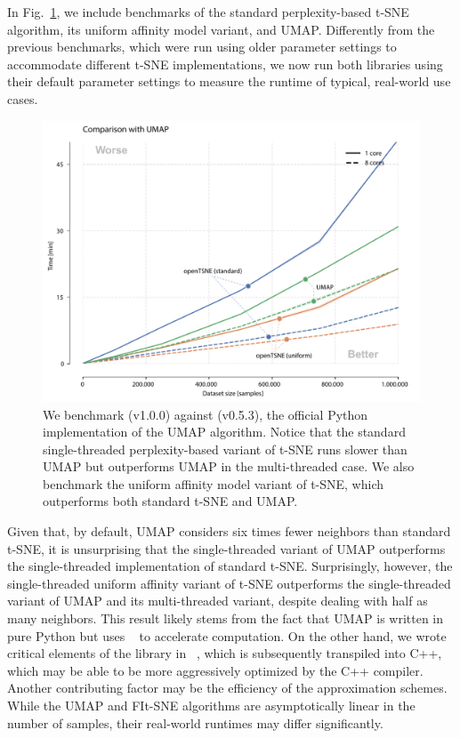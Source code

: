 \documentclass[article]{jss}
\newcommand{\opentsne}{\pkg{openTSNE}\xspace}
\begin{document}
In Fig.~\ref{fig:benchmarks_umap}, we include benchmarks of the standard perplexity-based t-SNE algorithm, its uniform affinity model variant, and UMAP. Differently from the previous benchmarks, which were run using older parameter settings to accommodate different t-SNE implementations, we now run both libraries using their default parameter settings to measure the runtime of typical, real-world use cases.
\begin{figure}[ht]
  \centering
  \includegraphics{benchmarks_umap-final}
  \caption{\label{fig:benchmarks_umap} We benchmark \opentsne (v1.0.0) against  (v0.5.3), the official \textsf{Python} implementation of the UMAP algorithm. Notice that the standard single-threaded perplexity-based variant of t-SNE runs slower than UMAP but outperforms UMAP in the multi-threaded case. We also benchmark the uniform affinity model variant of t-SNE, which outperforms both standard t-SNE and UMAP.}
\end{figure}

Given that, by default, UMAP considers six times fewer neighbors than standard t-SNE, it is unsurprising that the single-threaded variant of UMAP outperforms the single-threaded implementation of standard t-SNE. Surprisingly, however, the single-threaded uniform affinity variant of t-SNE outperforms the single-threaded variant of UMAP and its multi-threaded variant, despite dealing with half as many neighbors. This result likely stems from the fact that UMAP is written in pure \textsf{Python} but uses ~\citep{lam2015numba} to accelerate computation. On the other hand, we wrote critical elements of the \opentsne library in ~\citep{behnel2011cython}, which is subsequently transpiled into \textsf{C++}, which may be able to be more aggressively optimized by the \textsf{C++} compiler. Another contributing factor may be the efficiency of the approximation schemes. While the UMAP and FIt-SNE algorithms are asymptotically linear in the number of samples, their real-world runtimes may differ significantly.
\end{document}

